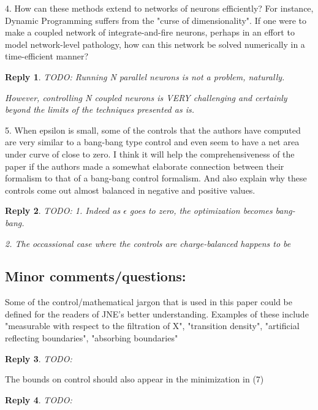 \documentclass{article}
\newtheorem*{rep}{Reply}
\begin{document}
4. How can these methods extend to networks of neurons efficiently? For
instance, Dynamic Programming suffers from the "curse of dimensionality". If one
were to make a coupled network of integrate-and-fire neurons, perhaps in an
effort to model network-level pathology, how can this network be solved
numerically in a time-efficient manner?
\begin{rep}
TODO:
Running N parallel neurons is not a problem, naturally.

However, controlling N coupled neurons is VERY challenging and certainly beyond
the limits of the techniques presented as is. 
\end{rep}

5. When epsilon is small, some of the controls that the authors have computed
are very similar to a bang-bang type control and even seem to have a net area
under curve of close to zero. I think it will help the comprehensiveness of the
paper if the authors made a somewhat elaborate connection between their
formalism to that of a bang-bang control formalism. And also explain why these
controls come out almost balanced in negative and positive values.
\begin{rep}
TODO:
1. Indeed as $\epsilon$ goes to zero, the optimization becomes bang-bang.

2. The occassional case where the controls are charge-balanced happens to be 
\end{rep}

\subsection{Minor comments/questions:}

Some of the control/mathematical jargon that is used in this paper could be
defined for the readers of JNE's better understanding. Examples of these include
"measurable with respect to the filtration of X", "transition density",
"artificial reflecting boundaries", "absorbing boundaries" 
\begin{rep}
TODO:
\end{rep}
The bounds on control should also appear in the minimization in (7)
\begin{rep}
TODO:
\end{rep}
\end{document}
